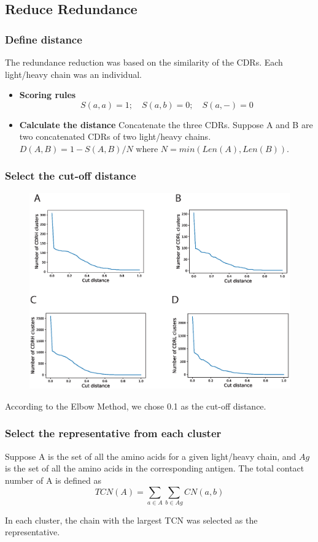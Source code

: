 \documentclass[hyperref={pdfpagelabels=false}]{beamer}
\begin{document}
\subsection{Reduce Redundance}
\begin{frame}
	\frametitle{Define distance}
	\vspace{-1.5cm}
	The redundance reduction was based on the similarity of the CDRs. Each light/heavy chain was an individual.

		\begin{itemize}
			\item 	\textbf{Scoring rules}
	$$S(a,a)=1;\quad S(a,b) = 0; \quad S(a, -) = 0$$
			\item  \textbf{Calculate the distance}
		Concatenate the three CDRs. Suppose A and B are two concatenated CDRs of two light/heavy chains.
	$D(A, B) = 1- S(A, B)/N$
	where $N=min(Len(A), Len(B))$.
		\end{itemize}
\end{frame}
\begin{frame}
\frametitle{Select the cut-off distance}
\vspace{-1cm}
		\begin{figure}
			\includegraphics[scale=0.3]{ElbowMethod.eps}
		\end{figure}
\vspace{-1cm}
	According to the Elbow Method, we chose 0.1 as the cut-off distance.
\end{frame}

\begin{frame}
\frametitle{Select the representative from each cluster}
Suppose A is the set of all the amino acids for a given light/heavy chain, and $Ag$ is the set of all the amino acids in the corresponding antigen. The total contact number of A is defined as
$$TCN(A)=\sum\limits_{a\in A}\sum\limits_{b\in Ag}CN(a,b)$$

In each cluster, the chain with the largest TCN was selected as the representative.
\end{frame}
\end{document}
